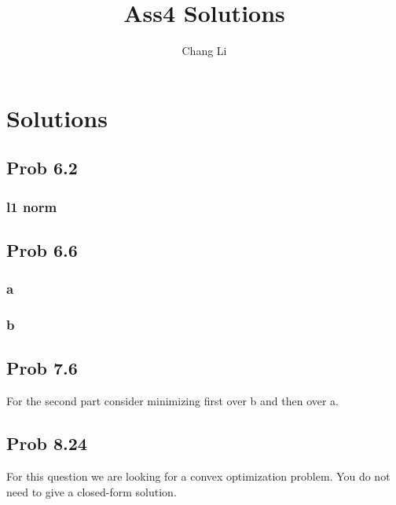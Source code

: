 \documentclass[10pt,a4paper]{article}
\begin{document}
\title{Ass4 Solutions}
\author{Chang Li}
\maketitle

\section{Solutions}

\subsection{Prob 6.2}

\subsubsection{l1 norm}



\subsection{Prob 6.6}

\subsubsection{a}


\subsubsection{b}


\subsection{Prob 7.6}
For the second part consider minimizing first over b and then over a.


\subsection{Prob 8.24}
For this question we are looking for a convex optimization problem. You do not need to give a closed-form solution.


	\renewcommand\refname{Bibliography}
	
	
\end{document}
